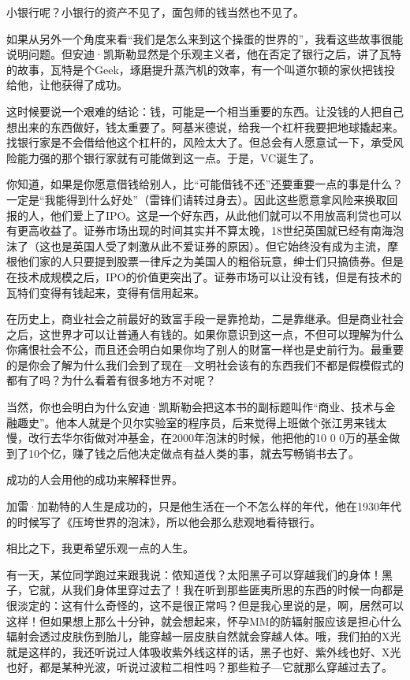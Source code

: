 小银行呢？小银行的资产不见了，面包师的钱当然也不见了。

如果从另外一个角度来看``我们是怎么来到这个操蛋的世界的''，我看这些故事很能说明问题。但安迪·凯斯勒显然是个乐观主义者，他在否定了银行之后，讲了瓦特的故事，瓦特是个Geek，琢磨提升蒸汽机的效率，有一个叫道尔顿的家伙把钱投给他，让他获得了成功。

这时候要说一个艰难的结论：钱，可能是一个相当重要的东西。让没钱的人把自己想出来的东西做好，钱太重要了。阿基米德说，给我一个杠杆我要把地球撬起来。找银行家是不会借给他这个杠杆的，风险太大了。但总会有人愿意试一下，承受风险能力强的那个银行家就有可能做到这一点。于是，VC诞生了。

你知道，如果是你愿意借钱给别人，比``可能借钱不还''还要重要一点的事是什么？一定是``我能得到什么好处''（雷锋们请转过身去）。因此这些愿意拿风险来换取回报的人，他们爱上了IPO。这是一个好东西，从此他们就可以不用放高利贷也可以有更高收益了。证券市场出现的时间其实并不算太晚，18世纪英国就已经有南海泡沫了（这也是英国人受了刺激从此不爱证券的原因）。但它始终没有成为主流，摩根他们家的人只要提到股票一律斥之为美国人的粗俗玩意，绅士们只搞债券。但是在技术成规模之后，IPO的价值更突出了。证券市场可以让没有钱，但是有技术的瓦特们变得有钱起来，变得有信用起来。

在历史上，商业社会之前最好的致富手段一是靠抢劫，二是靠继承。但是商业社会之后，这世界才可以让普通人有钱的。如果你意识到这一点，不但可以理解为什么你痛恨社会不公，而且还会明白如果你均了别人的财富一样也是史前行为。最重要的是你会了解为什么我们会到了现在---文明社会该有的东西我们不都是假模假式的都有了吗？为什么看着有很多地方不对呢？

当然，你也会明白为什么安迪·凯斯勒会把这本书的副标题叫作``商业、技术与金融趣史''。他本人就是个贝尔实验室的程序员，后来觉得上班做个张江男来钱太慢，改行去华尔街做对冲基金，在2000年泡沫的时候，他把他的10
0
0万的基金做到了10个亿，赚了钱之后他决定做点有益人类的事，就去写畅销书去了。

成功的人会用他的成功来解释世界。

加雷·加勒特的人生是成功的，只是他生活在一个不怎么样的年代，他在1930年代的时候写了《压垮世界的泡沫》，所以他会那么悲观地看待银行。

相比之下，我更希望乐观一点的人生。

有一天，某位同学跑过来跟我说：侬知道伐？太阳黑子可以穿越我们的身体！黑子，它就，从我们身体里穿过去了！我在听到那些匪夷所思的东西的时候一向都是很淡定的：这有什么奇怪的，这不是很正常吗？但是我心里说的是，啊，居然可以这样！但如果想上那么十分钟，就会想起来，怀孕MM的防辐射服应该是担心什么辐射会透过皮肤伤到胎儿，能穿越一层皮肤自然就会穿越人体。哦，我们拍的X光就是这样的，我还听说过人体吸收紫外线这样的话，黑子也好、紫外线也好、X光也好，都是某种光波，听说过波粒二相性吗？那些粒子---它就那么穿越过去了。

